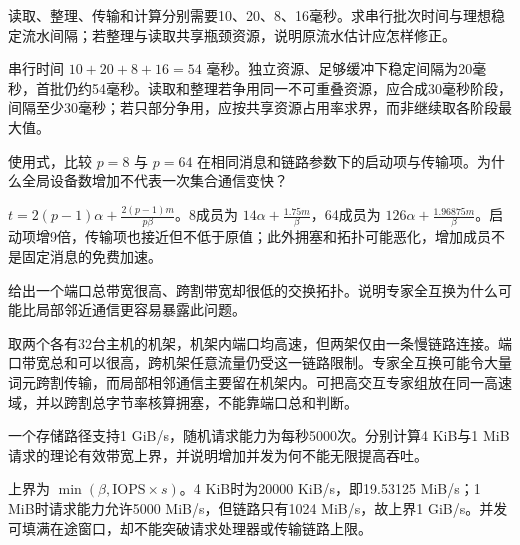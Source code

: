\begin{exercises}
\begin{exercise} 读取、整理、传输和计算分别需要10、20、8、16毫秒。求串行批次时间与理想稳定流水间隔；若整理与读取共享瓶颈资源，说明原流水估计应怎样修正。

\begin{solution}
串行时间 $10+20+8+16=54$ 毫秒。独立资源、足够缓冲下稳定间隔为20毫秒，首批仍约54毫秒。读取和整理若争用同一不可重叠资源，应合成30毫秒阶段，间隔至少30毫秒；若只部分争用，应按共享资源占用率求界，而非继续取各阶段最大值。
\end{solution}
\end{exercise}

\begin{exercise} 使用式，比较 $p=8$ 与 $p=64$ 在相同消息和链路参数下的启动项与传输项。为什么全局设备数增加不代表一次集合通信变快？

\begin{solution}
$t=2(p-1)\alpha+\frac{2(p-1)m}{p\beta}$。8成员为 $14\alpha+\frac{1.75m}{\beta}$，64成员为 $126\alpha+\frac{1.96875m}{\beta}$。启动项增9倍，传输项也接近但不低于原值；此外拥塞和拓扑可能恶化，增加成员不是固定消息的免费加速。
\end{solution}
\end{exercise}

\begin{exercise}\optional 给出一个端口总带宽很高、跨割带宽却很低的交换拓扑。说明专家全互换为什么可能比局部邻近通信更容易暴露此问题。

\begin{solution}
取两个各有32台主机的机架，机架内端口均高速，但两架仅由一条慢链路连接。端口带宽总和可以很高，跨机架任意流量仍受这一链路限制。专家全互换可能令大量词元跨割传输，而局部相邻通信主要留在机架内。可把高交互专家组放在同一高速域，并以跨割总字节率核算拥塞，不能靠端口总和判断。
\end{solution}
\end{exercise}

\begin{exercise} 一个存储路径支持1 GiB/s，随机请求能力为每秒5000次。分别计算4 KiB与1 MiB请求的理论有效带宽上界，并说明增加并发为何不能无限提高吞吐。

\begin{solution}
上界为 $\min(\beta,\mathrm{IOPS}\times s)$。4 KiB时为20000 KiB/s，即19.53125 MiB/s；1 MiB时请求能力允许5000 MiB/s，但链路只有1024 MiB/s，故上界1 GiB/s。并发可填满在途窗口，却不能突破请求处理器或传输链路上限。
\end{solution}
\end{exercise}


\end{exercises}
